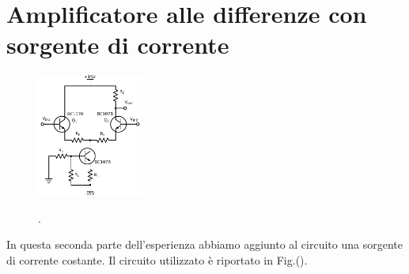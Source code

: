 \section{Amplificatore alle differenze con sorgente di corrente}
\begin{figure}
	\caption{.}
	\includegraphics[width=35mm]{cc2.pdf}
	\label{fig:cc2}
\end{figure}


In questa seconda parte dell'esperienza abbiamo aggiunto al circuito una sorgente di corrente costante. Il circuito utilizzato è riportato in Fig.().